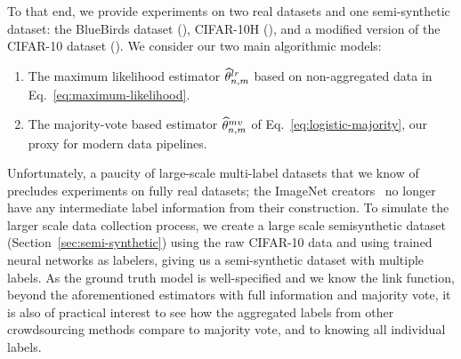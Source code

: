 \documentclass[11pt]{article}
\newcommand{\what}[1]{\widehat{#1}}
\newcommand{\lr}{^{\textup{lr}}}
\newcommand{\mv}{^{\textup{mv}}}
\newcommand{\<}{\langle} %
\renewcommand{\>}{\rangle}
\newcommand{\tmle}{\what{\theta}\lr_{n,m}} %
\newcommand{\mve}{\what{\theta}\mv_{n,m}} %
\begin{document}
To that end, we provide experiments on two real datasets and one
semi-synthetic dataset: the BlueBirds dataset (), CIFAR-10H
(), and a modified version of the CIFAR-10 dataset
(). We consider our two main algorithmic models:
\begin{enumerate}[label=(\roman*),leftmargin=*]
  \setlength{\itemsep}{0pt}
\item The maximum likelihood estimator $\tmle$ based on non-aggregated data in
  Eq.~\eqref{eq:maximum-likelihood}.
\item The majority-vote based estimator $\mve$ of
  Eq.~\eqref{eq:logistic-majority}, our proxy for modern data
  pipelines.
\end{enumerate}
%
Unfortunately, a paucity of large-scale multi-label datasets that we know of
precludes experiments on fully real datasets; the ImageNet
creators~\cite{DengDoSoLiLiFe09, RussakovskyDeSuKrSaMaHuKaKhBeBeFe15} no
longer have any intermediate label information from their construction. To
simulate the larger scale data collection process, we create a large scale
semisynthetic dataset (Section~\ref{sec:semi-synthetic}) using the raw
CIFAR-10 data and using trained neural networks as labelers, giving us a
semi-synthetic dataset with multiple labels. As the ground truth model is
well-specified and we know the link function, beyond the aforementioned
estimators with full information and majority vote, it is also of practical
interest to see how the aggregated labels from other crowdsourcing methods
compare to majority vote, and to knowing all individual labels.


\end{document}
